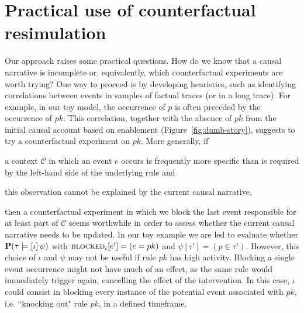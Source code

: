 \section{Practical use of  counterfactual resimulation}
\label{sec:cosim-practice}

Our approach raises some practical questions. How do we know that a
causal narrative is incomplete or, equivalently, which counterfactual
experiments are worth trying? One way to proceed is by developing
heuristics, such as identifying correlations between events in samples
of factual traces (or in a long trace). For example, in our toy model,
the occurrence of $p$ is often preceded by the occurrence of
$pk$. This correlation, together with the absence of $pk$ from the
initial causal account based on enablement
(Figure~\ref{fig:dumb-story}), suggests to try a counterfactual
experiment on $pk$. More generally, if
\begin{inparaenum}[(i)]
\item a context $\mathcal C$ in which an event $e$ occurs is
  frequently more specific than is required by the left-hand side of
  the underlying rule and
\item this observation cannot be explained by the current causal
  narrative,
\end{inparaenum}
then a counterfactual experiment in which we block the last event
responsible for at least part of $\mathcal C$ seems worthwhile in
order to assess whether the current causal narrative needs to be
updated. In our toy example we are led to evaluate whether
$\mathbf{P}(\tau \models [\iota] \, \psi{})$ with ${\textsc{blocked}}_{\iota}[e'] = (e = pk)$ and
$\psi[\tau'] = (p \in \tau')$. However, this choice of $\iota$ and
$\psi$ may not be useful if rule $pk$ has high activity. Blocking a
single event occurrence might not have much of an effect, as the same
rule would immediately trigger again, cancelling the effect of the
intervention.  In this case, $\iota$ could consist in blocking every
instance of the potential event associated with $pk$, i.e.\@
``knocking out" rule $pk$, in a defined timeframe.
